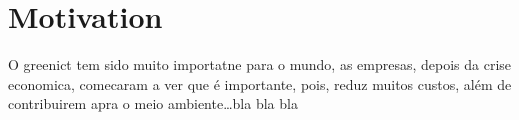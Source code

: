 

\chapter*{Motivation} \label{motivation}
O greenict tem sido muito importatne para o mundo, as empresas, depois da crise economica, comecaram a ver que é importante, pois, reduz muitos custos, além de contribuirem apra o meio ambiente\ldots bla bla bla

